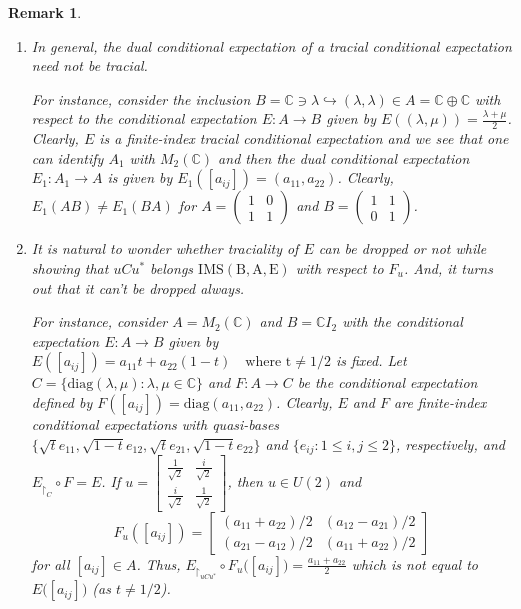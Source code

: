 \documentclass[a4]{amsart}
\newtheorem{remark}[theorem]{\bf Remark}
\numberwithin{equation}{section}
\newcommand{\C}{\mathbb{C}}
\begin{document}
\begin{remark}
  \begin{enumerate}
    \item In general, the dual conditional expectation of a tracial
      conditional expectation need not be tracial.

      For instance, consider the inclusion $B= \C \ni \lambda
      \hookrightarrow (\lambda, \lambda) \in A= \C \oplus \C$ with
      respect to the conditional expectation $E: A\to B$ given by
      $E((\lambda, \mu)) = \frac{\lambda + \mu}{2}$. Clearly, $E$ is a
      finite-index tracial conditional expectation and we see that one
      can identify $A_1$ with $M_2(\C)$ and then the dual conditional
      expectation $E_1: A_1 \to A$ is given by $E_1([a_{ij}]) =
      (a_{11}, a_{22})$. Clearly, $E_1(AB) \neq E_1(BA)$ for $A
      =\begin{pmatrix} 1 & 0 \\ 1 & 1 \end{pmatrix}$ and $B
      =\begin{pmatrix} 1 & 1 \\ 0 & 1 \end{pmatrix}$.

    \item      It is natural to  wonder whether traciality of $E$ can be dropped or not while
  showing that $uCu^*$ belongs $\mathrm{IMS (B,A,E)}$ with respect to
  $F_u$. And, it turns out that it can't be dropped always.

  For instance, consider $A= M_2(\C)$ and $B= \C I_2$ with the
  conditional expectation $E : A\to B$ given by \( E([a_{ij}]) =
  a_{11} t + a_{22} (1-t) \quad \text{where t}\neq 1/2 \) is
  fixed. Let $C= \{ \mathrm{diag}(\lambda, \mu) : \lambda,\mu \in\C\}$
  and $F: A\to C$ be the conditional expectation defined by
  $F([a_{ij}]) = \mathrm{diag}(a_{11},a_{22})$. Clearly, $E$ and $F$
  are finite-index conditional expectations with quasi-bases $\{ \sqrt {t} e_{11}, \sqrt{1-t} e_{12}, \sqrt{t} e_{21}, \sqrt{1-t} e_{22}\}$ and $\{ e_{ij} : 1 \leq i,j\leq 2 \}$, respectively, and
  $E_{\restriction_C}\circ F = E$. If $u = \begin{bmatrix}
    \frac{1}{\sqrt{2}} & \frac{i}{\sqrt{2}} \\ \frac{i}{\sqrt{2}} &
    \frac{1}{\sqrt{2}}
\end{bmatrix}$, then $u\in U(2)$ and 
\[
F_u ([a_{ij}]) = \begin{bmatrix}
(a_{11}+ a_{22})/2 & (a_{12}-a_{21})/2 \\ (a_{21}-a_{12})/2 & (a_{11} + a_{22})/2
\end{bmatrix}
\]
for all $[a_{ij}]\in A$. Thus, $E_{\restriction_{uCu^*}}\circ F_u
\big([a_{ij}]\big) = \frac{a_{11} + a_{22}}{2}$ which is not equal to
$E\big([a_{ij}]\big)$  (as $t \ne 1/2$).
  \end{enumerate}
\end{remark}
\end{document}
